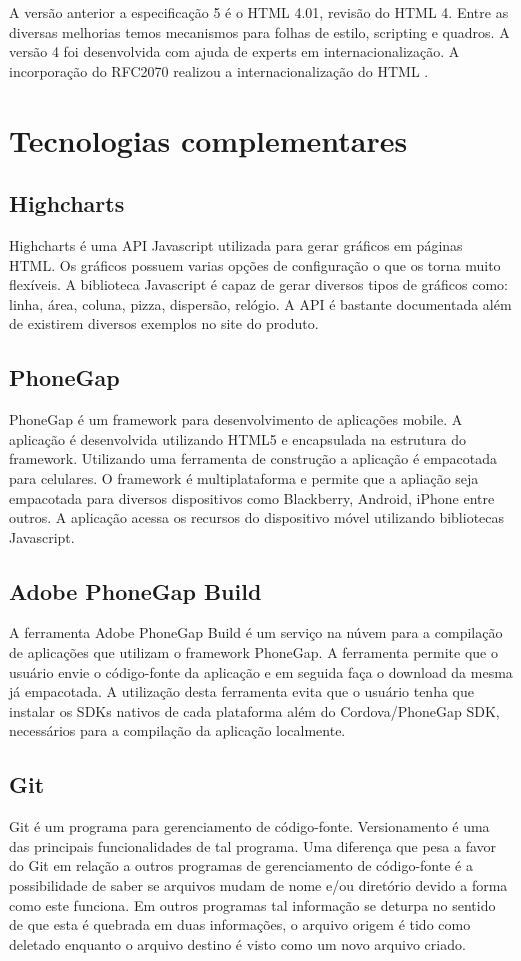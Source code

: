 A versão anterior a especificação 5 é o HTML 4.01, revisão do HTML 4. Entre as diversas melhorias temos mecanismos para folhas de estilo, scripting e quadros. A versão 4 foi desenvolvida com ajuda de experts em internacionalização. A incorporação do RFC2070 realizou a internacionalização do HTML \cite{html4Int}.

\chapter{Tecnologias complementares}

\section{Highcharts}
Highcharts é uma API Javascript utilizada para gerar gráficos em páginas HTML. Os gráficos possuem varias opções de configuração o que os torna muito flexíveis. A biblioteca Javascript é capaz de gerar diversos tipos de gráficos como: linha, área, coluna, pizza, dispersão, relógio. A API é bastante documentada além de existirem diversos exemplos no site do produto.

\section{PhoneGap}
PhoneGap é um framework para desenvolvimento de aplicações mobile. A aplicação é desenvolvida utilizando HTML5 e encapsulada na estrutura do framework. Utilizando uma ferramenta de construção a aplicação é empacotada para celulares. O framework é multiplataforma e permite que a apliação seja empacotada para diversos dispositivos como Blackberry, Android, iPhone entre outros. A aplicação acessa os recursos do dispositivo móvel utilizando bibliotecas Javascript.

\section{Adobe PhoneGap Build}
A ferramenta Adobe PhoneGap Build é um serviço na núvem para a compilação de aplicações que utilizam o framework PhoneGap. A ferramenta permite que o usuário envie o código-fonte da aplicação e em seguida faça o download da mesma já empacotada. A utilização desta ferramenta evita que o usuário tenha que instalar os SDKs nativos de cada plataforma além do Cordova/PhoneGap SDK, necessários para a compilação da aplicação localmente.

\section{Git}
Git é um programa para gerenciamento de código-fonte. Versionamento é uma das principais funcionalidades de tal programa. Uma diferença que pesa a favor do Git em relação a outros programas de gerenciamento de  código-fonte é a possibilidade de saber se arquivos mudam de nome e/ou diretório devido a forma como este funciona. Em outros programas tal informação se deturpa no sentido de que esta é quebrada em duas informações, o arquivo origem é tido como deletado enquanto o arquivo destino é visto como um novo arquivo criado.

